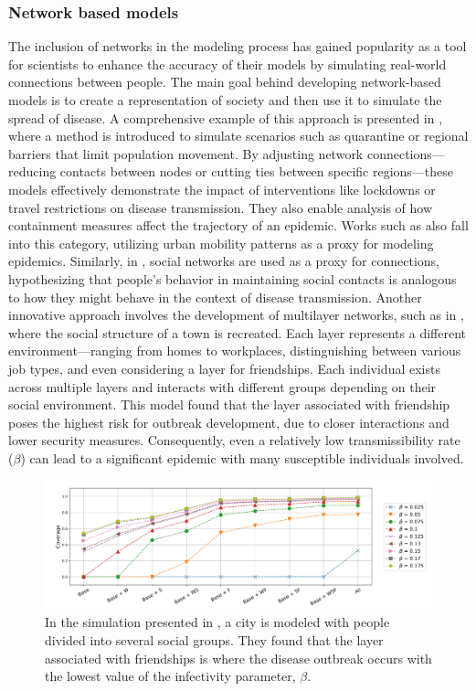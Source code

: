 \subsubsection{Network based models}
The inclusion of networks in the modeling process has gained popularity as a tool for scientists to enhance the accuracy of their models by simulating real-world connections between people. The main goal behind developing network-based models is to create a representation of society and then use it to simulate the spread of disease. A comprehensive example of this approach is presented in \cite{VanMieghem2009}, where a method is introduced to simulate scenarios such as quarantine or regional barriers that limit population movement. By adjusting network connections—reducing contacts between nodes or cutting ties between specific regions—these models effectively demonstrate the impact of interventions like lockdowns or travel restrictions on disease transmission. They also enable analysis of how containment measures affect the trajectory of an epidemic.
Works such as \cite{Tizzoni2014} also fall into this category, utilizing urban mobility patterns as a proxy for modeling epidemics. Similarly, in \cite{Carballosa_2021}, social networks are used as a proxy for connections, hypothesizing that people's behavior in maintaining social contacts is analogous to how they might behave in the context of disease transmission.
Another innovative approach involves the development of multilayer networks, such as in \cite{Turker_2023}, where the social structure of a town is recreated. Each layer represents a different environment—ranging from homes to workplaces, distinguishing between various job types, and even considering a layer for friendships. Each individual exists across multiple layers and interacts with different groups depending on their social environment. This model found that the layer associated with friendship poses the highest risk for outbreak development, due to closer interactions and lower security measures. Consequently, even a relatively low transmissibility rate ($\beta$) can lead to a significant epidemic with many susceptible individuals involved.
\begin{figure}[h]
	\centering
	\includegraphics[width=0.9\linewidth]{0_introduction/images_review/turker_city_recreated}
	\caption[Simulation of disease spreading within a city]{In the simulation presented in \cite{Turker_2023}, a city is modeled with people divided into several social groups. They found that the layer associated with friendships is where the disease outbreak occurs with the lowest value of the infectivity parameter, $\beta$.}
	\label{fig:turkercityrecreated}
\end{figure}



